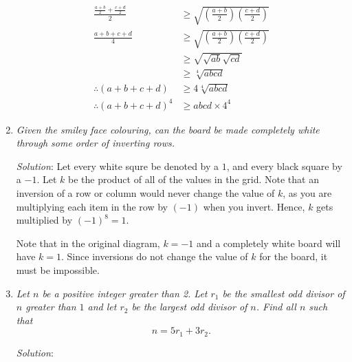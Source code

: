 \documentclass{article}
\begin{document}
\begin{enumerate}[1.]
\begin{align*}
  \frac{ \frac{a + b}{2} + \frac{c + d}{2} }{2} &\ge \sqrt{ ( \frac{a + b}{2} )( \frac{c + d}{2} ) } \\
  \frac{a + b + c + d}{4} &\ge \sqrt{ ( \frac{a + b}{2} )( \frac{c + d}{2} )} \\
  &\ge \sqrt{ \sqrt{ab} \sqrt{cd} } \\
  &\ge \sqrt[4]{abcd} \\
  \therefore (a + b + c + d) &\ge 4\sqrt[4]{abcd} \\ 
  \therefore (a + b + c + d)^4 &\ge abcd \times 4^4
\end{align*}

\item %
\textit{Given the smiley face colouring, can the board be made completely white through some order of inverting rows.
}

\textit{Solution}:
Let every white squre be denoted by a $1$, and every black square by a $-1$. Let $k$ be the product of all of the values in the grid. 
Note that an inversion of a row or column would never change the value of $k$, as you are multiplying each item in the row by $(-1)$ when you invert. Hence, $k$ gets multiplied by $(-1)^8 = 1$.

Note that in the original diagram, $k = -1$ and a completely white board will have $k = 1$. Since inversions do not change the value of $k$ for the board, it must be impossible.


\item %
\textit{Let $n$ be a positive integer greater than 2. Let $r_1$ be the smallest odd divisor of $n$ greater than $1$ and let $r_2$ be the largest odd divisor of $n$. Find all $n$ such that
\[ n=5r_{1}+3r_{2}. \]
}

\textit{Solution}:


\end{enumerate}
\end{document}
